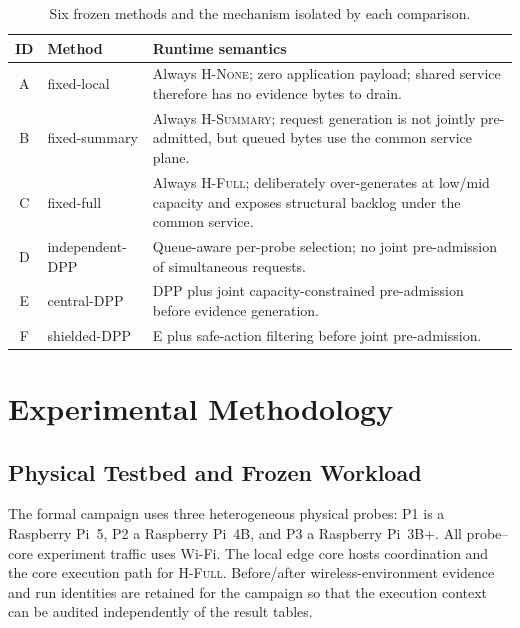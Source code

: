 \documentclass[10pt,journal]{IEEEtran}
\newcommand{\Hnone}{\textsc{H-None}}
\newcommand{\Hsummary}{\textsc{H-Summary}}
\newcommand{\Hfull}{\textsc{H-Full}}
\begin{document}
\begin{table}[t]
\centering
\caption{Six frozen methods and the mechanism isolated by each comparison.}
\label{tab:methods}
\scriptsize
\setlength{\tabcolsep}{2.7pt}
\begin{tabular}{@{}clp{4.55cm}@{}}
\toprule
ID & Method & Runtime semantics\\
\midrule
A & fixed-local & Always \Hnone; zero application payload; shared service therefore has no evidence bytes to drain.\\
B & fixed-summary & Always \Hsummary; request generation is not jointly pre-admitted, but queued bytes use the common service plane.\\
C & fixed-full & Always \Hfull; deliberately over-generates at low/mid capacity and exposes structural backlog under the common service.\\
D & independent-DPP & Queue-aware per-probe selection; no joint pre-admission of simultaneous requests.\\
E & central-DPP & DPP plus joint capacity-constrained pre-admission before evidence generation.\\
F & shielded-DPP & E plus safe-action filtering before joint pre-admission.\\
\bottomrule
\end{tabular}
\end{table}

\section{Experimental Methodology}
\subsection{Physical Testbed and Frozen Workload}
The formal campaign uses three heterogeneous physical probes: P1 is a Raspberry Pi~5, P2 a Raspberry Pi~4B, and P3 a Raspberry Pi~3B+. All probe--core experiment traffic uses Wi-Fi. The local edge core hosts coordination and the core execution path for \Hfull. Before/after wireless-environment evidence and run identities are retained for the campaign so that the execution context can be audited independently of the result tables.
\end{document}
